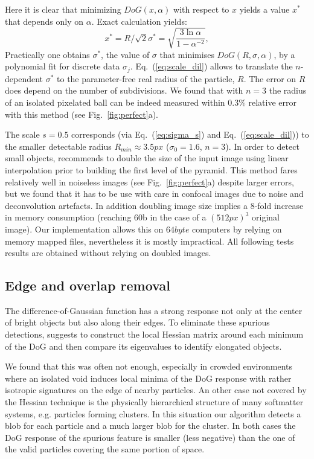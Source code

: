 \documentclass[8.5pt,twoside,twocolumn]{article}
\begin{document}
Here it is clear that minimizing $DoG(x, \alpha)$ with respect to $x$ yields a value $x^*$ that depends only on $\alpha$. Exact calculation yields:
\begin{equation}
	x^* = R/\sqrt{2}\sigma^* = \sqrt{\frac{3\ln \alpha}{1-\alpha^{-2}}}, 
	\label{eq:scale_dil}
\end{equation}
Practically one obtains $\sigma^*$, the value of $\sigma$ that minimises $DoG(R,\sigma, \alpha)$, by a polynomial fit for discrete data $\sigma_j$. Eq.~(\ref{eq:scale_dil}) allows to translate the $n$-dependent $\sigma^*$ to the parameter-free real radius of the particle, $R$. The error on $R$ does depend on the number of subdivisions. We found that with $n=3$ the radius of an isolated pixelated ball can be indeed measured within $0.3\%$ relative error with this method (see Fig.~\ref{fig:perfect}a).

The scale $s=0.5$ corresponds (via Eq.~(\ref{eq:sigma_s}) and Eq.~(\ref{eq:scale_dil})) to the smaller detectable radius $R_{min}\approx \unit{3.5}{px}$ ($\sigma_0=1.6$, $n=3$). In order to detect small objects, \citet{Lowe2004} recommends to double the size of the input image using linear interpolation prior to building the first level of the pyramid. This method fares relatively well in noiseless images (see Fig.~\ref{fig:perfect}a) despite larger errors, but we found that it has to be use with care in confocal images due to noise and deconvolution artefacts. In addition doubling image size implies a 8-fold increase in memory consumption (reaching \unit{60}{\giga b} in the case of a $(\unit{512}{px})^3$ original image). Our implementation allows this on $\unit{64}{byte}$ computers by relying on memory mapped files, nevertheless it is mostly impractical. All following tests results are obtained without relying on doubled images.

\subsection{Edge and overlap removal}

The difference-of-Gaussian function has a strong response not only at the center of bright objects but also along their edges. To eliminate these spurious detections, \citet{Lowe2004} suggests to construct the local Hessian matrix around each minimum of the DoG and then compare its eigenvalues to identify elongated objects.

We found that this was often not enough, especially in crowded environments where an isolated void induces local minima of the DoG response with rather isotropic signatures on the edge of nearby particles. An other case not covered by the Hessian technique is the physically hierarchical structure of many softmatter systems, e.g. particles forming clusters. In this situation our algorithm detects a blob for each particle and a much larger blob for the cluster. In both cases the DoG response of the spurious feature is smaller (less negative) than the one of the valid particles covering the same portion of space. 
\end{document}
